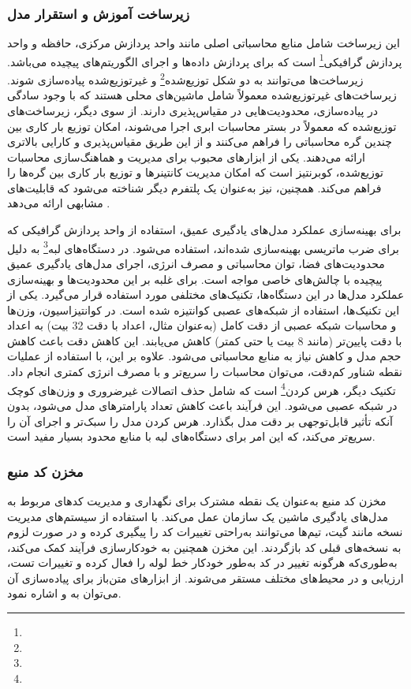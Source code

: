  
\subsubsection{زیرساخت آموزش و استقرار مدل}
این زیرساخت شامل منابع محاسباتی اصلی مانند واحد پردازش مرکزی، حافظه و واحد پردازش گرافیکی\footnote{} است که برای پردازش داده‌ها و اجرای الگوریتم‌های پیچیده می‌باشد. زیرساخت‌ها می‌توانند به دو شکل توزیع‌شده\footnote{} و غیرتوزیع‌شده پیاده‌سازی شوند. زیرساخت‌های غیرتوزیع‌شده معمولاً شامل ماشین‌های محلی هستند که با وجود سادگی در پیاده‌سازی، محدودیت‌هایی در مقیاس‌پذیری دارند. از سوی دیگر، زیرساخت‌های توزیع‌شده که معمولاً در بستر محاسبات ابری اجرا می‌شوند، امکان توزیع بار کاری بین چندین گره محاسباتی را فراهم می‌کنند و از این طریق مقیاس‌پذیری و کارایی بالاتری ارائه می‌دهند. یکی از ابزارهای محبوب برای مدیریت و هماهنگ‌سازی محاسبات توزیع‌شده، کوبرنتیز است که امکان مدیریت کانتینرها و توزیع بار کاری بین گره‌ها را فراهم می‌کند. همچنین،  نیز به‌عنوان یک پلتفرم دیگر شناخته می‌شود که قابلیت‌های مشابهی ارائه می‌دهد \cite{MLOpsCloud1}.

برای بهینه‌سازی عملکرد مدل‌های یادگیری عمیق، استفاده از واحد پردازش گرافیکی که برای ضرب ماتریسی بهینه‌سازی شده‌اند، استفاده می‌شود. در دستگاه‌های لبه\footnote{} به دلیل محدودیت‌های فضا، توان محاسباتی و مصرف انرژی، اجرای مدل‌های یادگیری عمیق پیچیده با چالش‌های خاصی مواجه است. برای غلبه بر این محدودیت‌ها و بهینه‌سازی عملکرد مدل‌ها در این دستگاه‌ها، تکنیک‌های مختلفی مورد استفاده قرار می‌گیرد. یکی از این تکنیک‌ها، استفاده از شبکه‌های عصبی کوانتیزه شده است. در کوانتیزاسیون، وزن‌ها و محاسبات شبکه عصبی از دقت کامل (به‌عنوان مثال، اعداد با دقت 32 بیت) به اعداد با دقت پایین‌تر (مانند 8 بیت یا حتی کمتر) کاهش می‌یابند. این کاهش دقت باعث کاهش حجم مدل و کاهش نیاز به منابع محاسباتی می‌شود. علاوه بر این، با استفاده از عملیات نقطه شناور کم‌دقت، می‌توان محاسبات را سریع‌تر و با مصرف انرژی کمتری انجام داد. تکنیک دیگر، هرس کردن\footnote{} است که شامل حذف اتصالات غیرضروری و وزن‌های کوچک در شبکه عصبی می‌شود. این فرآیند باعث کاهش تعداد پارامترهای مدل می‌شود، بدون آنکه تأثیر قابل‌توجهی بر دقت مدل بگذارد. هرس کردن مدل را سبک‌تر و اجرای آن را سریع‌تر می‌کند، که این امر برای دستگاه‌های لبه با منابع محدود بسیار مفید است.



\subsubsection{مخزن کد منبع}
مخزن کد منبع به‌عنوان یک نقطه مشترک برای نگهداری و مدیریت کدهای مربوط به مدل‌های یادگیری ماشین یک سازمان عمل می‌کند. با استفاده از سیستم‌های مدیریت نسخه مانند گیت، تیم‌ها می‌توانند به‌راحتی تغییرات کد را پیگیری کرده و در صورت لزوم به نسخه‌های قبلی کد بازگردند. این مخزن همچنین به خودکارسازی فرآیند  کمک می‌کند، به‌طوری‌که هرگونه تغییر در کد به‌طور خودکار خط لوله را فعال کرده و تغییرات تست، ارزیابی و در محیط‌های مختلف مستقر می‌شوند. از ابزارهای متن‌باز برای پیاده‌سازی آن می‌توان به \cite{GitLab} و \cite{Gerrit} اشاره نمود.

